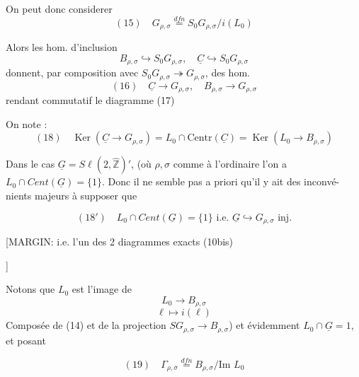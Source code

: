 \begin{enumerate}
On peut donc considerer
$$ (15) \quad G_{\rho,\sigma} \overset{dfn}{=} S_0 G_{\rho,\sigma} / i(L_0) $$

Alors les hom. d'inclusion
$$ B_{\rho,\sigma} \hookrightarrow S_0 G_{\rho,\sigma} , \quad \underline{C} \hookrightarrow S_0 G_{\rho,\sigma} $$
donnent, par composition avec $S_0 G_{\rho,\sigma} \twoheadrightarrow G_{\rho,\sigma}$,
des hom.
$$ (16) \quad \underline{C} \to G_{\rho,\sigma} , \quad B_{\rho,\sigma} \to G_{\rho,\sigma} $$
rendant commutatif le diagramme
(17)

On note :
$$ (18) \quad \operatorname{Ker}(\underline{C} \to G_{\rho,\sigma}) = L_0 \cap \text{Centr}(\underline{C}) = \operatorname{Ker}(L_0 \to B_{\rho,\sigma}) $$

\newpage


Dans le cas $\underline{G} = S \ell(2, \hat{\mathbb{Z}})'$, (où $\rho,\sigma$ comme à l'ordinaire
l'on a $L_0 \cap Cent(\underline{G}) = \{1\}$. Donc il
ne semble pas a priori qu'il y ait des inconvé-
nients majeurs à supposer que

$$ (18') \quad L_0 \cap Cent(\underline{G}) = \{1\} \text{ i.e. } \underline{G} \hookrightarrow G_{\rho,\sigma} \text{ inj.} $$

[MARGIN: i.e. l'un des 2 diagrammes exacts
(10bis)
]

Notons que $L_0$ est l'image de
$$ L_0 \to B_{\rho,\sigma} $$
$$ \ell \mapsto i(\ell) $$
Composée de (14) et de la projection $S G_{\rho,\sigma} \to B_{\rho,\sigma}$)
et évidemment $L_0 \cap \underline{G} = 1$, et posant

$$ (19) \quad \Gamma_{\rho,\sigma} \stackrel{dfn}{=} B_{\rho,\sigma} / \text{Im } L_0 $$


\end{enumerate}
